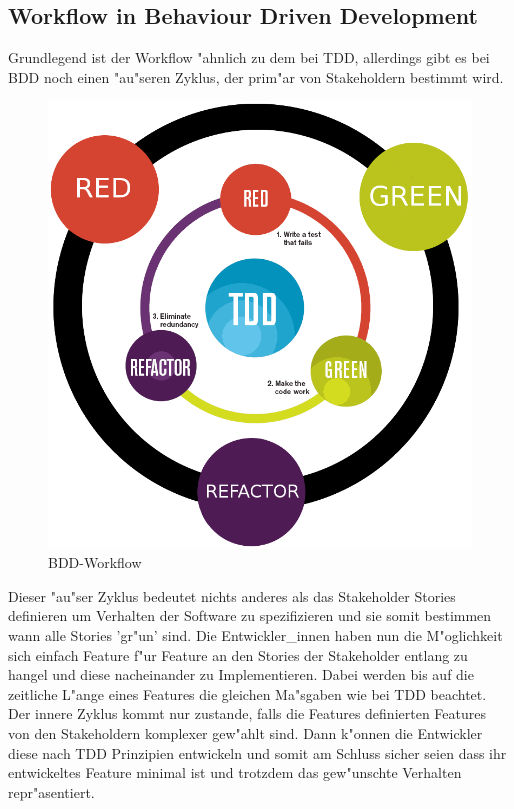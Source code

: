   \subsection{Workflow in Behaviour Driven Development}
    Grundlegend ist der Workflow "ahnlich zu dem bei TDD, allerdings gibt es 
    bei BDD noch einen "au"seren Zyklus, der prim"ar von Stakeholdern bestimmt wird.
    \begin{figure}
      \vspace{-30pt}
      \begin{center}
        \includegraphics[scale=0.3]{assets/bdd_flow.png}
      \end{center}
      \caption{BDD-Workflow}
      \vspace{-15pt}
    \end{figure}
    Dieser "au"ser Zyklus bedeutet nichts anderes als das Stakeholder Stories
    definieren um Verhalten der Software zu spezifizieren und sie somit bestimmen
    wann alle Stories 'gr"un' sind. Die Entwickler\_innen haben nun die M"oglichkeit sich einfach Feature f"ur Feature an den Stories der Stakeholder entlang zu 
    hangel und diese nacheinander zu Implementieren. Dabei werden bis auf die 
    zeitliche L"ange eines Features die gleichen Ma"sgaben wie bei TDD beachtet.\\
    Der innere Zyklus kommt nur zustande, falls die Features definierten Features
    von den Stakeholdern komplexer gew"ahlt sind. Dann k"onnen die Entwickler 
    diese nach TDD Prinzipien entwickeln und somit am Schluss sicher seien 
    dass ihr entwickeltes Feature minimal ist und trotzdem das gew"unschte 
    Verhalten repr"asentiert.\\


